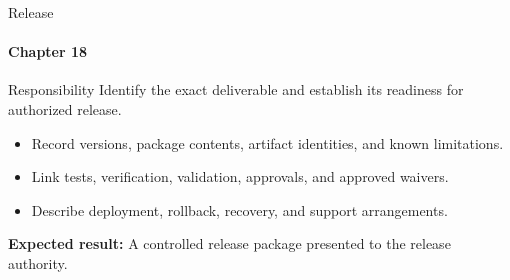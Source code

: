 \begin{frame}{Release}
\framesubtitle{Chapter 18}
\begin{block}{Responsibility}
Identify the exact deliverable and establish its readiness for authorized release.
\end{block}
\begin{itemize}
  \item Record versions, package contents, artifact identities, and known limitations.
  \item Link tests, verification, validation, approvals, and approved waivers.
  \item Describe deployment, rollback, recovery, and support arrangements.
\end{itemize}
\vspace{0.15cm}
\textbf{Expected result:} A controlled release package presented to the release authority.
\end{frame}
